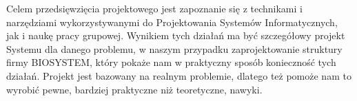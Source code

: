 

Celem przedsięwzięcia projektowego jest zapoznanie się z technikami i narzędziami wykorzystywanymi do Projektowania Systemów Informatycznych, jak i naukę pracy grupowej.
Wynikiem tych działań ma być szczegółowy projekt Systemu dla danego problemu, w naszym przypadku zaprojektowanie struktury firmy BIOSYSTEM, który 
pokaże nam w praktyczny sposób konieczność tych działań. Projekt jest bazowany na realnym problemie, dlatego też pomoże nam to wyrobić pewne, bardziej praktyczne niż teoretyczne, nawyki.
